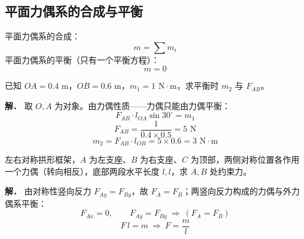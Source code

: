 \subsection{平面力偶系的合成与平衡}

平面力偶系的合成：
\begin{equation}
\boxed{\;m=\sum m_i\;}
\label{eq:2-力偶-合成}
\end{equation}
平面力偶系的平衡（只有一个平衡方程）：
\begin{equation}
\boxed{\;m=0\;}
\label{eq:2-力偶-平衡}
\end{equation}

\begin{example}[力偶平衡例1]
已知 $OA=0.4\text{ m}$，$OB=0.6\text{ m}$，$m_1=1\text{ N}\cdot\text{m}$，求平衡时 $m_2$ 与 $F_{AB}$。

\textbf{解．} 取 $O,A$ 为对象。由力偶性质——力偶只能由力偶平衡：
\begin{equation}
F_{AB}\cdot l_{OA}\sin30^\circ=m_1
\label{eq:2-例-力偶1}
\end{equation}
\begin{equation}
F_{AB}=\frac{1}{0.4\times0.5}=5\text{ N}
\label{eq:2-例-力偶1-力}
\end{equation}
\begin{equation}
m_2=F_{AB}\cdot l_{OB}=5\times0.6=3\text{ N}\cdot\text{m}
\label{eq:2-例-力偶1-m2}
\end{equation}
\end{example}

\begin{example}
左右对称拱形框架，$A$ 为左支座、$B$ 为右支座、$C$ 为顶部，两侧对称位置各作用一个力偶（转向相反），底部两段水平长度 $l,l$，求 $A,B$ 处约束力。

\textbf{解．} 由对称性竖向反力 $F_{Ay}=F_{By}$，故 $F_A=F_B$；两竖向反力构成的力偶与外力偶系平衡：
\begin{equation}
F_{Ax}=0,\qquad F_{Ay}=F_{By}\ \Rightarrow\ (F_A=F_B)
\label{eq:2-例-力偶2-对称}
\end{equation}
\begin{equation}
F\,l=m\ \Rightarrow\ F=\frac{m}{l}
\label{eq:2-例-力偶2-力}
\end{equation}
\end{example}

